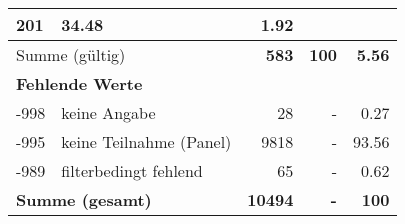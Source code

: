 \begin{longtable}{lXrrr}
       \num{201} &
       \num[round-mode=places,round-precision=2]{34,48} &
         \num[round-mode=places,round-precision=2]{1,92} \\
     \midrule
     \multicolumn{2}{l}{Summe (gültig)} &
       \textbf{\num{583}} &
     \textbf{100} &
       \textbf{\num[round-mode=places,round-precision=2]{5,56}} \\
     \multicolumn{5}{l}{\textbf{Fehlende Werte}}\\
       -998 &
       keine Angabe &
         \num{28} &
        - &
         \num[round-mode=places,round-precision=2]{0,27} \\
       -995 &
       keine Teilnahme (Panel) &
         \num{9818} &
        - &
         \num[round-mode=places,round-precision=2]{93,56} \\
       -989 &
       filterbedingt fehlend &
         \num{65} &
        - &
         \num[round-mode=places,round-precision=2]{0,62} \\
     \midrule
     \multicolumn{2}{l}{\textbf{Summe (gesamt)}} &
          \textbf{\num{10494}} &
        \textbf{-} &
        \textbf{100} \\
     \bottomrule
     \end{longtable}
     
